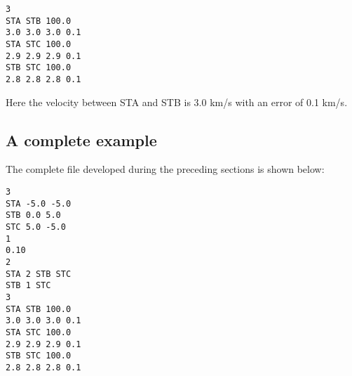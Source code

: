 \documentclass[a4paper,12pt]{article}
\begin{document}
\begin{verbatim}
3
STA STB 100.0
3.0 3.0 3.0 0.1
STA STC 100.0
2.9 2.9 2.9 0.1
STB STC 100.0
2.8 2.8 2.8 0.1
\end{verbatim}

Here the velocity between STA and STB is 3.0 km/s with an error of 0.1 km/s.

\subsection{A complete example}

The complete file developed during the preceding sections is shown below:

\begin{verbatim}
3
STA -5.0 -5.0
STB 0.0 5.0
STC 5.0 -5.0
1
0.10
2
STA 2 STB STC
STB 1 STC
3
STA STB 100.0
3.0 3.0 3.0 0.1
STA STC 100.0
2.9 2.9 2.9 0.1
STB STC 100.0
2.8 2.8 2.8 0.1
\end{verbatim}



\end{document}
